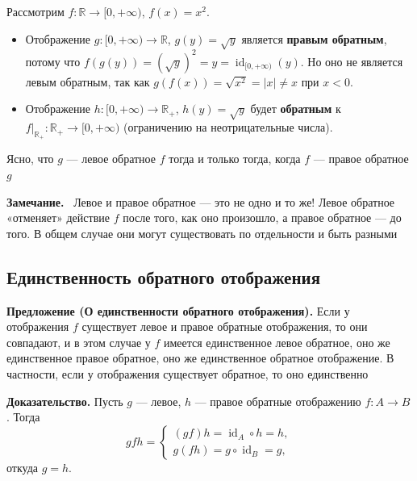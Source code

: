 \documentclass[a4paper,12pt]{article}
\newcommand{\myremark}{\textbf{Замечание.}\ }
\theoremstyle{definition}
\theoremstyle{plain}
\theoremstyle{remark}
\begin{document}
	\begin{tcolorbox}[colback=gray!5, colframe=gray!50, title=Пример]
		Рассмотрим $f \colon \mathbb{R} \to [0, +\infty)$, $f(x) = x^2$.
		\begin{itemize}
			\item Отображение $g \colon [0, +\infty) \to \mathbb{R}$, $g(y) = \sqrt{y}$ является \textbf{правым обратным}, потому что $f(g(y)) = (\sqrt{y})^2 = y = \operatorname{id}_{[0, +\infty)}(y)$. Но оно не является левым обратным, так как $g(f(x)) = \sqrt{x^2} = |x| \neq x$ при $x < 0$.
			\item Отображение $h \colon [0, +\infty) \to \mathbb{R}_+$, $h(y) = \sqrt{y}$ будет \textbf{обратным} к $f|_{\mathbb{R}_+} \colon \mathbb{R}_+ \to [0, +\infty)$ (ограничению на неотрицательные числа).
		\end{itemize}
	\end{tcolorbox}
	
	\begin{tcolorbox}[colback=yellow!5, colframe=orange!60!black, title=Замечание]
		Ясно, что $g$ — левое обратное $f$ тогда и только тогда, когда $f$ — правое обратное $g$
	\end{tcolorbox}
	
	\myremark
	Левое и правое обратное — это не одно и то же! Левое обратное «отменяет» действие $f$ после того, как оно произошло, а правое обратное — до того. В общем случае они могут существовать по отдельности и быть разными
	
	\subsection{Единственность обратного отображения}
	
	\noindent \textbf{Предложение (О единственности обратного отображения).}
	Если у отображения $f$ существует левое и правое обратные отображения, то они совпадают, и в этом случае у $f$ имеется единственное левое обратное, оно же единственное правое обратное, оно же единственное обратное отображение. В частности, если у отображения существует обратное, то оно единственно
	
	\medskip
	\noindent \textbf{Доказательство.}
	Пусть $g$ — левое, $h$ — правое обратные отображению $f \colon A \to B$. Тогда
	\[
	gfh = 
	\begin{cases}
		(gf)h = \operatorname{id}_A \circ h = h, \\
		g(fh) = g \circ \operatorname{id}_B = g,
	\end{cases}
	\]
	откуда $g = h$.
	
\end{document}
